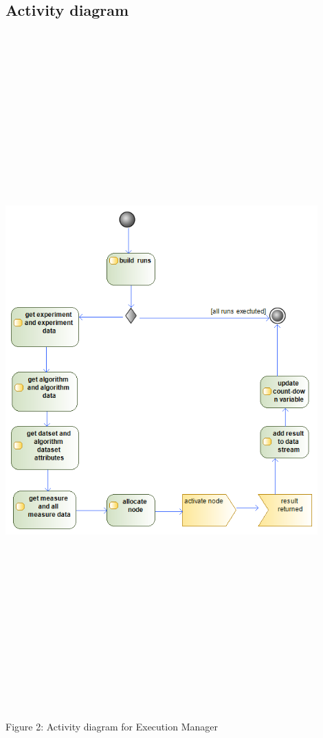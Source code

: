 \subsection{Activity diagram}
    \includegraphics[width=12cm,height=26cm,keepaspectratio]{execution_manager/images/execution_manager_activity_diagram.png}
	\begin{center}
	    \small{Figure 2: Activity diagram for Execution Manager}
    \end{center}


